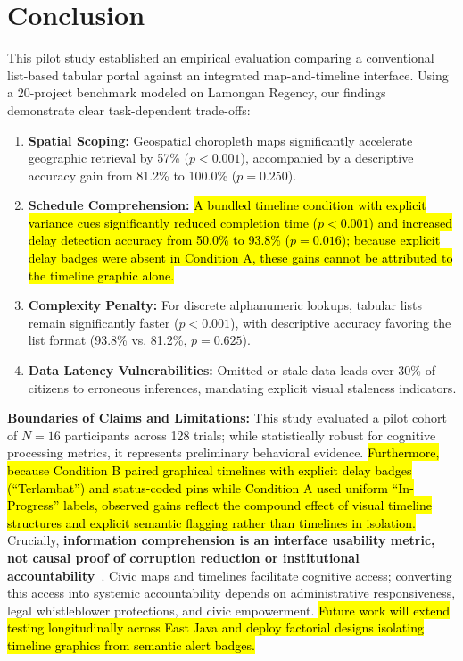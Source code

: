 \documentclass[runningheads]{llncs}
\begin{document}
\section{Conclusion}
This pilot study established an empirical evaluation comparing a conventional list-based tabular portal against an integrated map-and-timeline interface. Using a 20-project benchmark modeled on Lamongan Regency, our findings demonstrate clear task-dependent trade-offs:
\begin{enumerate}\setlength{\itemsep}{-1pt}\setlength{\parskip}{0pt}
    \item \textbf{Spatial Scoping:} Geospatial choropleth maps significantly accelerate geographic retrieval by 57\% ($p < 0.001$), accompanied by a descriptive accuracy gain from 81.2\% to 100.0\% ($p = 0.250$).
    \item \textbf{Schedule Comprehension:} \hl{A bundled timeline condition with explicit variance cues significantly reduced completion time ($p < 0.001$) and increased delay detection accuracy from 50.0\% to 93.8\% ($p = 0.016$); because explicit delay badges were absent in Condition A, these gains cannot be attributed to the timeline graphic alone.}
    \item \textbf{Complexity Penalty:} For discrete alphanumeric lookups, tabular lists remain significantly faster ($p < 0.001$), with descriptive accuracy favoring the list format (93.8\% vs. 81.2\%, $p = 0.625$).
    \item \textbf{Data Latency Vulnerabilities:} Omitted or stale data leads over 30\% of citizens to erroneous inferences, mandating explicit visual staleness indicators.
\end{enumerate}

\noindent\textbf{Boundaries of Claims and Limitations:} This study evaluated a pilot cohort of $N = 16$ participants across 128 trials; while statistically robust for cognitive processing metrics, it represents preliminary behavioral evidence. \hl{Furthermore, because Condition B paired graphical timelines with explicit delay badges (``Terlambat'') and status-coded pins while Condition A used uniform ``In-Progress'' labels, observed gains reflect the compound effect of visual timeline structures and explicit semantic flagging rather than timelines in isolation.} Crucially, \textbf{information comprehension is an interface usability metric, not causal proof of corruption reduction or institutional accountability}~\cite{ambituuni2025infrastructure,saelawong2024transparency}. Civic maps and timelines facilitate cognitive access; converting this access into systemic accountability depends on administrative responsiveness, legal whistleblower protections, and civic empowerment. \hl{Future work will extend testing longitudinally across East Java and deploy factorial designs isolating timeline graphics from semantic alert badges.}
\end{document}
